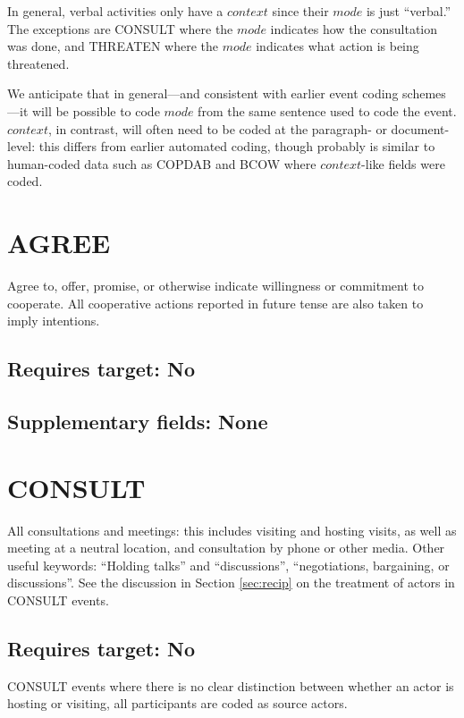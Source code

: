 \documentclass[11pt]{report}
\newcommand{\plcat}[1]{\textsf{#1}}
\begin{document}
In general, verbal activities only have a $context$ since their $mode$ is just ``verbal.'' The exceptions are \plcat{CONSULT} where the $mode$ indicates how the consultation was done, and \plcat{THREATEN} where the $mode$ indicates what action is being threatened. 

We anticipate that in general---and consistent with earlier event coding schemes---it will be possible to code $mode$ from the same sentence used to code the event. $context$, in contrast, will often need to be coded at the paragraph- or document-level: this differs from earlier automated coding, though probably is similar to human-coded data such as COPDAB and BCOW where $context$-like fields were coded.


\section{AGREE}

Agree to, offer, promise, or otherwise indicate willingness or commitment to cooperate.  All cooperative actions reported in future tense are also taken to imply intentions. 

\subsection{Requires target: No}

\subsection{Supplementary fields: None}

\bigskip  

\section{CONSULT}

All consultations and meetings: this includes visiting and hosting visits, as well as meeting at a neutral location, and consultation by phone or other media. Other useful keywords: ``Holding talks'' and ``discussions'', ``negotiations, bargaining, or discussions''. See the discussion in Section \ref{sec:recip} on the treatment of actors in \plcat{CONSULT} events.

\subsection{Requires target: No}

\plcat{CONSULT} events where there is no clear distinction between whether an actor is hosting or visiting, all participants are coded as source actors. 
\end{document}
